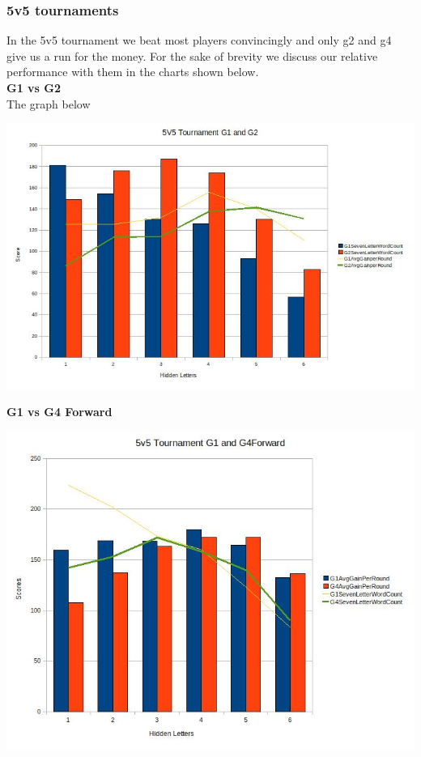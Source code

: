 \documentclass[11pt]{article}
\begin{document}
	\subsubsection{5v5 tournaments}
	In the 5v5 tournament we beat most players convincingly and only g2 and g4 give us a run for the money. For the sake of brevity we discuss our relative performance with them in the charts shown below.\\
	\textbf{G1 vs G2}\\
	The graph below
	\begin{center}
\includegraphics[width=1 \textwidth]{5v5option3G1G2}
\end{center}
	\textbf{G1 vs G4 Forward}
	\begin{center}
\includegraphics[width=1 \textwidth]{5v5optionG1G4}
\end{center}
\end{document}
